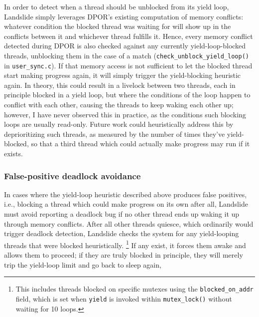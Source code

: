 In order to detect when a thread should be unblocked from its yield loop,
Landslide simply leverages DPOR's existing computation of memory conflicts:
whatever condition the blocked thread was waiting for
will show up in the conflicts between it and whichever thread fulfills it.
Hence, every memory conflict detected during DPOR is also checked against any
currently yield-loop-blocked threads, unblocking them in the case of a match
({\tt check\_unblock\_yield\_loop()} in {\tt user\_sync.c}).
If that memory access is not sufficient to let the blocked thread start making progress again,
it will simply trigger the yield-blocking heuristic again.
In theory, this could result in a livelock between two threads,
each in principle blocked in a yield loop,
but where the conditions of the loop happen to conflict with each other,
causing the threads to keep waking each other up;
however,
I have never observed this in practice, as the conditions  such blocking loops are usually read-only.
Future work could heuristically address this by deprioritizing such threads,
as measured by the number of times they've yield-blocked,
so that a third thread which could actually make progress may run if it exists.


\subsubsection{False-positive deadlock avoidance}

In cases where the yield-loop heuristic described above produces false positives,
i.e., blocking a thread which could make progress on its own after all,
Landslide must avoid reporting a deadlock bug if no other thread ends up waking it up through memory conflicts.
After all other threads quiesce,
which ordinarily would trigger deadlock detection,
Landslide checks the system for any yield-looping threads that were blocked heuristically.%
\footnote{This includes threads blocked on specific mutexes using the {\tt blocked\_on\_addr} field,
which is set when {\tt yield} is invoked within {\tt mutex\_lock()} without waiting for 10 loops.}
If any exist, it forces them awake and allows them to proceed;
if they are truly blocked in principle,
they will merely trip the yield-loop limit and go back to sleep again,

